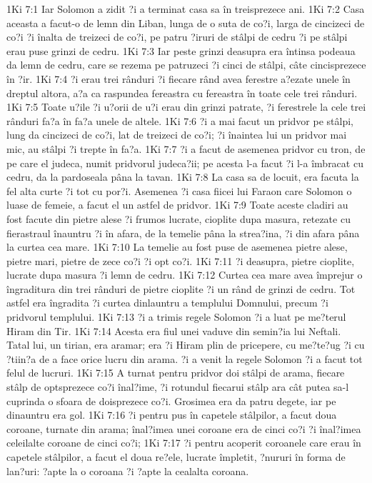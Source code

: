1Ki 7:1  Iar Solomon a zidit ?i a terminat casa sa în treisprezece ani.
1Ki 7:2  Casa aceasta a facut-o de lemn din Liban, lunga de o suta de co?i, larga de cincizeci de co?i ?i înalta de treizeci de co?i, pe patru ?iruri de stâlpi de cedru ?i pe stâlpi erau puse grinzi de cedru.
1Ki 7:3  Iar peste grinzi deasupra era întinsa podeaua da lemn de cedru, care se rezema pe patruzeci ?i cinci de stâlpi, câte cincisprezece în ?ir.
1Ki 7:4  ?i erau trei rânduri ?i fiecare rând avea ferestre a?ezate unele în dreptul altora, a?a ca raspundea fereastra cu fereastra în toate cele trei rânduri.
1Ki 7:5  Toate u?ile ?i u?orii de u?i erau din grinzi patrate, ?i ferestrele la cele trei rânduri fa?a în fa?a unele de altele.
1Ki 7:6  ?i a mai facut un pridvor pe stâlpi, lung da cincizeci de co?i, lat de treizeci de co?i; ?i înaintea lui un pridvor mai mic, au stâlpi ?i trepte în fa?a.
1Ki 7:7  ?i a facut de asemenea pridvor cu tron, de pe care el judeca, numit pridvorul judeca?ii; pe acesta l-a facut ?i l-a îmbracat cu cedru, da la pardoseala pâna la tavan.
1Ki 7:8  La casa sa de locuit, era facuta la fel alta curte ?i tot cu por?i. Asemenea ?i casa fiicei lui Faraon care Solomon o luase de femeie, a facut el un astfel de pridvor.
1Ki 7:9  Toate aceste cladiri au fost facute din pietre alese ?i frumos lucrate, cioplite dupa masura, retezate cu fierastraul înauntru ?i în afara, de la temelie pâna la strea?ina, ?i din afara pâna la curtea cea mare.
1Ki 7:10  La temelie au fost puse de asemenea pietre alese, pietre mari, pietre de zece co?i ?i opt co?i.
1Ki 7:11  ?i deasupra, pietre cioplite, lucrate dupa masura ?i lemn de cedru.
1Ki 7:12  Curtea cea mare avea împrejur o îngraditura din trei rânduri de pietre cioplite ?i un rând de grinzi de cedru. Tot astfel era îngradita ?i curtea dinlauntru a templului Domnului, precum ?i pridvorul templului.
1Ki 7:13  ?i a trimis regele Solomon ?i a luat pe me?terul Hiram din Tir.
1Ki 7:14  Acesta era fiul unei vaduve din semin?ia lui Neftali. Tatal lui, un tirian, era aramar; era ?i Hiram plin de pricepere, cu me?te?ug ?i cu ?tiin?a de a face orice lucru din arama. ?i a venit la regele Solomon ?i a facut tot felul de lucruri.
1Ki 7:15  A turnat pentru pridvor doi stâlpi de arama, fiecare stâlp de optsprezece co?i înal?ime, ?i rotundul fiecarui stâlp ara cât putea sa-l cuprinda o sfoara de doisprezece co?i. Grosimea era da patru degete, iar pe dinauntru era gol.
1Ki 7:16  ?i pentru pus în capetele stâlpilor, a facut doua coroane, turnate din arama; înal?imea unei coroane era de cinci co?i ?i înal?imea celeilalte coroane de cinci co?i;
1Ki 7:17  ?i pentru acoperit coroanele care erau în capetele stâlpilor, a facut el doua re?ele, lucrate împletit, ?nururi în forma de lan?uri: ?apte la o coroana ?i ?apte la cealalta coroana.
